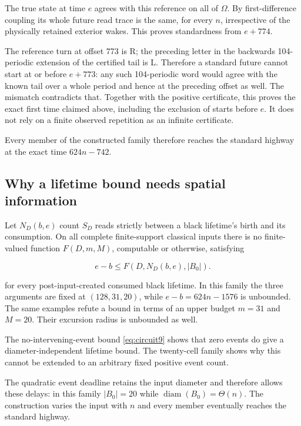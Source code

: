 \documentclass[
  11pt,
]{article}
\begin{document}
The true state at time \(e\) agrees with this reference on all of \(\Omega\). By
first-difference coupling its whole future read trace is the same, for
every \(n\), irrespective of the physically retained exterior wakes. This
proves standardness from \(e+774\).

The reference turn at offset 773 is \(\mathrm R\); the preceding letter in the
backwards 104-periodic extension of the certified tail is \(\mathrm L\). Therefore a
standard future cannot start at or before \(e+773\): any such 104-periodic
word would agree with the known tail over a whole period and hence at
the preceding offset as well. The mismatch contradicts that. Together
with the positive certificate, this proves the exact first time
claimed above, including the exclusion of starts before \(e\). It does not rely
on a finite observed repetition as an infinite certificate.

Every member of the constructed family therefore reaches the standard
highway at the exact time \(624n-742\).

\subsection{Why a lifetime bound needs spatial information}\label{circuit-5}

Let $N_D(b,e)$ count $S_D$ reads strictly between a black lifetime's birth
and its consumption. On all complete finite-support classical inputs
there is no finite-valued function \(F(D,m,M)\), computable or otherwise,
satisfying

\begin{equation}\label{eq:circuit8}
e-b\le F(D,N_D(b,e),|B_0|).
\end{equation}

for every post-input-created consumed black lifetime. In this family the
three arguments are fixed at \((128,31,20)\), while \(e-b=624n-1576\) is
unbounded. The same examples refute a bound in terms of an upper budget
\(m=31\) and \(M=20\). Their excursion radius is unbounded as well.

The no-intervening-event bound \eqref{eq:circuit9} shows that zero events do give a
diameter-independent lifetime bound. The twenty-cell family shows why this
cannot be extended to an arbitrary fixed positive event count.

The quadratic event deadline retains the input diameter and therefore
allows these delays: in this family $|B_0|=20$ while
$\operatorname{diam}(B_0)=\Theta(n)$. The construction varies the input with
$n$ and every member eventually reaches the standard highway.
\end{document}
